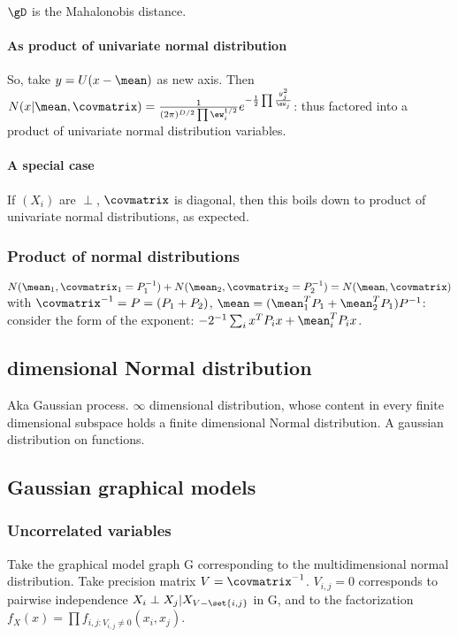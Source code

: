\documentclass[oneside, article]{memoir}
\begin{document}
$\gD$ is the Mahalonobis distance.

\paragraph*{As product of univariate normal distribution}
So, take $y = U(x-\mean)$ as new axis. Then $N(x|\mean, \covmatrix) = \\
\frac{1}{(2\pi)^{D/2} \prod \ew_{i}^{1/2}} e^{-\frac{1}{2} \prod \frac{y_{j}^{2}}{\ew_{j}}}$: thus factored into a product of univariate normal distribution variables.

\paragraph*{A special case}
If $(X_{i})$ are $\perp$, $\covmatrix$ is diagonal, then this boils down to product of univariate normal distributions, as expected.

\subsubsection{Product of normal distributions}
$N(\mean_1, \covmatrix_1 = P_1^{-1}) + N(\mean_2, \covmatrix_2 = P_2^{-1}) = N(\mean, \covmatrix)$ with $\covmatrix^{-1} = P = (P_1 + P_2)$, $\mean = (\mean_1^{T}P_1 + \mean_2^{T}P_1)P^{-1}$: consider the form of the exponent: $-2^{-1}\sum_i x^{T}P_ix + \mean_i^{T}P_ix$.

\subsection{ dimensional Normal distribution}
Aka Gaussian process. $\infty$ dimensional distribution, whose content in every finite dimensional subspace holds a finite dimensional Normal distribution. A gaussian distribution on functions.

\subsection{Gaussian graphical models}
\subsubsection{Uncorrelated variables}
Take the graphical model graph G corresponding to the multidimensional normal distribution. Take precision matrix $V = \covmatrix^{-1}$. $V_{i,j} = 0$ corresponds to pairwise independence $X_i \perp X_j| X_{V - \set{i,j}}$ in G, and to the factorization $f_X(x) = \prod f_{i,j: V_{i,j} \neq 0}(x_i, x_j)$.
\end{document}
